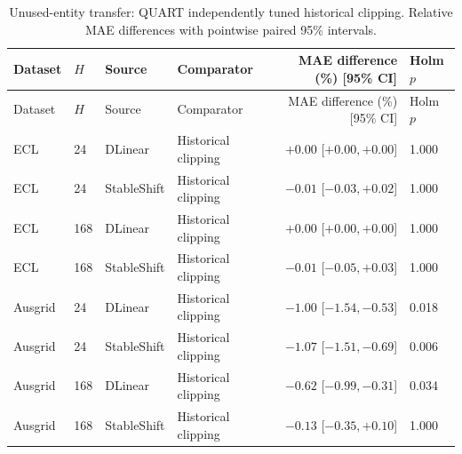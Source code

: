 \begin{longtable}{lllp{}rp{}}
\caption{Unused-entity transfer: QUART independently tuned historical clipping. Relative MAE differences with pointwise paired 95\% intervals.}\label{tab:withheld_independently_tuned_history}\\
\toprule
Dataset & $H$ & Source & Comparator & MAE difference (\%) [95\% CI] & Holm $p$\\
\midrule
\endfirsthead
\toprule
Dataset & $H$ & Source & Comparator & MAE difference (\%) [95\% CI] & Holm $p$\\
\midrule
\endhead
ECL & 24 & DLinear & Historical clipping & $+0.00$ [$ +0.00, +0.00 $] & 1.000\\
ECL & 24 & StableShift & Historical clipping & $-0.01$ [$ -0.03, +0.02 $] & 1.000\\
ECL & 168 & DLinear & Historical clipping & $+0.00$ [$ +0.00, +0.00 $] & 1.000\\
ECL & 168 & StableShift & Historical clipping & $-0.01$ [$ -0.05, +0.03 $] & 1.000\\
Ausgrid & 24 & DLinear & Historical clipping & $-1.00$ [$ -1.54, -0.53 $] & 0.018\\
Ausgrid & 24 & StableShift & Historical clipping & $-1.07$ [$ -1.51, -0.69 $] & 0.006\\
Ausgrid & 168 & DLinear & Historical clipping & $-0.62$ [$ -0.99, -0.31 $] & 0.034\\
Ausgrid & 168 & StableShift & Historical clipping & $-0.13$ [$ -0.35, +0.10 $] & 1.000\\
\bottomrule
\end{longtable}
